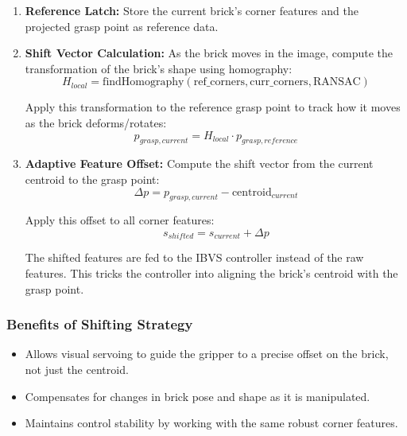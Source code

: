 \begin{enumerate}
    \item \textbf{Reference Latch:} Store the current brick's corner features and the projected grasp point as reference data.
    
    \item \textbf{Shift Vector Calculation:} As the brick moves in the image, compute the transformation of the brick's shape using homography:
    \begin{equation}
        H_{local} = \text{findHomography}(\text{ref\_corners}, \text{curr\_corners}, \text{RANSAC})
    \end{equation}
    
    Apply this transformation to the reference grasp point to track how it moves as the brick deforms/rotates:
    \begin{equation}
        p_{grasp,current} = H_{local} \cdot p_{grasp,reference}
    \end{equation}
    
    \item \textbf{Adaptive Feature Offset:} Compute the shift vector from the current centroid to the grasp point:
    \begin{equation}
        \Delta p = p_{grasp,current} - \text{centroid}_{current}
    \end{equation}
    
    Apply this offset to all corner features:
    \begin{equation}
        s_{shifted} = s_{current} + \Delta p
    \end{equation}
    
    The shifted features are fed to the IBVS controller instead of the raw features. This tricks the controller into aligning the brick's centroid with the grasp point.
\end{enumerate}

\subsubsection{Benefits of Shifting Strategy}
\begin{itemize}
    \item Allows visual servoing to guide the gripper to a precise offset on the brick, not just the centroid.
    \item Compensates for changes in brick pose and shape as it is manipulated.
    \item Maintains control stability by working with the same robust corner features.
\end{itemize}

